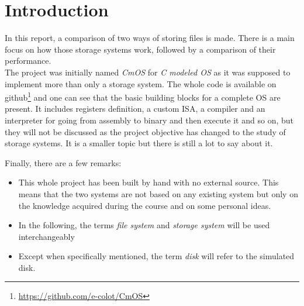 \documentclass[10pt,a4paper]{ULBreport}
\begin{document}
 





\chapter{Introduction}

In this report, a comparison of two ways of storing files is made. There is a main focus on how those storage systems work, followed by a comparison of their performance. \\

The project was initially named \textit{CmOS} for \textit{C modeled OS} as it was supposed to implement more than only a storage system. The whole code is available on github\footnote{\href{https://github.com/e-colot/CmOS}{https://github.com/e-colot/CmOS}} and one can see that the basic building blocks for a complete OS are present. It includes registers definition, a custom ISA, a compiler and an interpreter for going from assembly to binary and then execute it and so on, but they will not be discussed as the project objective has changed to the study of storage systems. It is a smaller topic but there is still a lot to say about it. 

Finally, there are a few remarks:
\begin{itemize}
    \item This whole project has been built by hand with no external source. This means that the two systems are not based on any existing system but only on the knowledge acquired during the course and on some personal ideas.
    \item In the following, the terms \textit{file system} and \textit{storage system} will be used interchangeably
    \item Except when specifically mentioned, the term \textit{disk} will refer to the simulated disk.
\end{itemize}
\end{document}

